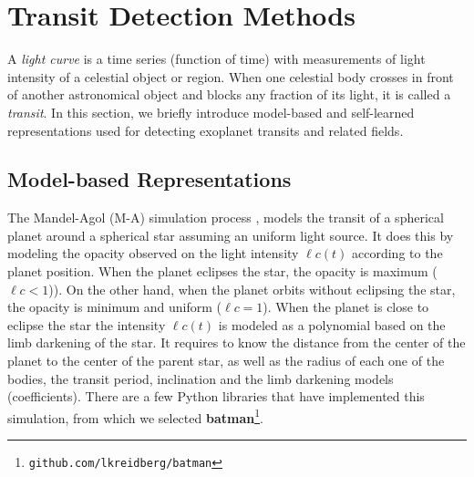 
\section{Transit Detection Methods} %
\label{soa}

A \textit{light curve} is a time series (function of time) with measurements of light intensity of a celestial object or region.
When one celestial body crosses in front of another astronomical object and blocks any fraction of its light, it is called a \textit{transit}. In this section, we briefly introduce model-based and self-learned representations used for detecting exoplanet transits and related fields.

\subsection{Model-based Representations}

The Mandel-Agol (M-A) simulation process \citep{mandel2002analytic}, models the transit of a spherical planet around a spherical star assuming an uniform light source. It does this by modeling the opacity observed on the light intensity $\ell c(t)$ according to the planet position. When the planet eclipses the star, the opacity is maximum ($\ell c<1$)). On the other hand, when the planet orbits without eclipsing the star, the opacity is minimum and uniform ($\ell c = 1$). When the planet is close to eclipse the star the intensity $\ell c(t)$ is modeled as a polynomial based on the limb darkening of the star. It requires to know the distance from the center of the planet to the center of the parent star, as well as the radius of each one of the bodies, the transit period, inclination and the limb darkening models (coefficients). There are a few Python libraries that have implemented this simulation, from which we selected \textbf{batman}\footnote{\texttt{github.com/lkreidberg/batman}}.

